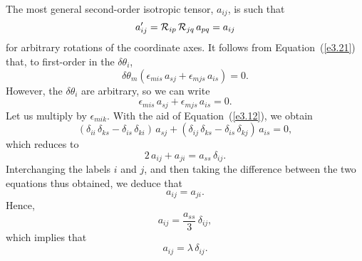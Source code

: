 The most general second-order isotropic tensor, $a_{ij}$,  is such that
\begin{equation}\label{e3.60}
a_{ij}' = {\cal R}_{ip}\,{\cal R}_{jq}\,a_{pq} = a_{ij}
\end{equation}
for arbitrary rotations of the coordinate axes. 
It follows from Equation~(\ref{e3.21}) that, to first-order in the $\delta\theta_i$, 
\begin{equation}
\delta \theta_m \left(\epsilon_{mis}\,a_{sj} + \epsilon_{mjs}\,a_{is}\right) = 0.
\end{equation}
However, the $\delta\theta_i$ are arbitrary, so we can write
\begin{equation}\label{e3.62}
\epsilon_{mis}\,a_{sj} + \epsilon_{mjs}\,a_{is}=0.
\end{equation}
Let us multiply by $\epsilon_{mik}$. With the aid of Equation~(\ref{e3.12}), we obtain
\begin{equation}
(\delta_{ii}\,\delta_{ks}-\delta_{is}\,\delta_{ki})\,a_{sj} + (\delta_{ij}\,\delta_{ks} -\delta_{is}\,\delta_{kj})\,a_{is} = 0,
\end{equation}
which reduces to 
\begin{equation}
2\,a_{ij} + a_{ji} = a_{ss}\,\delta_{ij}.
\end{equation}
Interchanging the labels $i$ and $j$, and then taking the difference between the two equations thus obtained, we deduce that
\begin{equation}
a_{ij} = a_{ji}.
\end{equation}
Hence,
\begin{equation}
a_{ij} = \frac{a_{ss}}{3}\,\delta_{ij},
\end{equation}
which implies that
\begin{equation}
a_{ij } =\lambda\,\delta_{ij}.
\end{equation}

